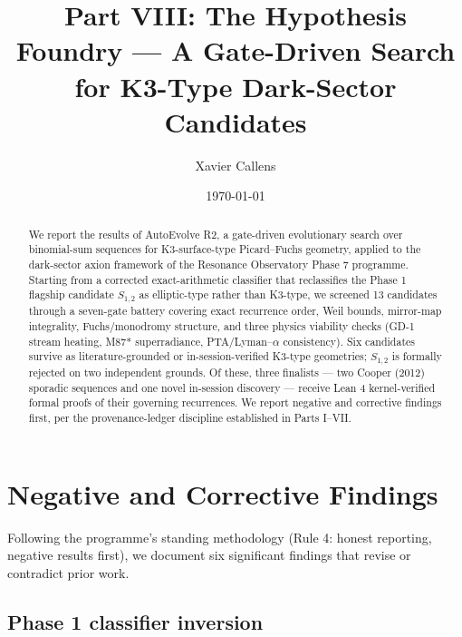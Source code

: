 \documentclass[aps,prd,twocolumn,nofootinbib,superscriptaddress,10pt]{revtex4-2}
\begin{document}
\title{Part VIII: The Hypothesis Foundry --- A Gate-Driven Search for K3-Type Dark-Sector Candidates}

\author{Xavier Callens}

\date{\today}


\begin{abstract}
We report the results of AutoEvolve R2, a gate-driven evolutionary search over binomial-sum sequences for K3-surface-type Picard--Fuchs geometry, applied to the dark-sector axion framework of the Resonance Observatory Phase 7 programme. Starting from a corrected exact-arithmetic classifier that reclassifies the Phase 1 flagship candidate $S_{1,2}$ as elliptic-type rather than K3-type, we screened 13 candidates through a seven-gate battery covering exact recurrence order, Weil bounds, mirror-map integrality, Fuchs/monodromy structure, and three physics viability checks (GD-1 stream heating, M87* superradiance, PTA/Lyman--$\alpha$ consistency). Six candidates survive as literature-grounded or in-session-verified K3-type geometries; $S_{1,2}$ is formally rejected on two independent grounds. Of these, three finalists --- two Cooper (2012) sporadic sequences and one novel in-session discovery --- receive Lean 4 kernel-verified formal proofs of their governing recurrences. We report negative and corrective findings first, per the provenance-ledger discipline established in Parts I--VII.
\end{abstract}

\maketitle

\section{Negative and Corrective Findings}

Following the programme's standing methodology (Rule 4: honest reporting, negative results first), we document six significant findings that revise or contradict prior work.

\subsection{Phase 1 classifier inversion}
\end{document}

